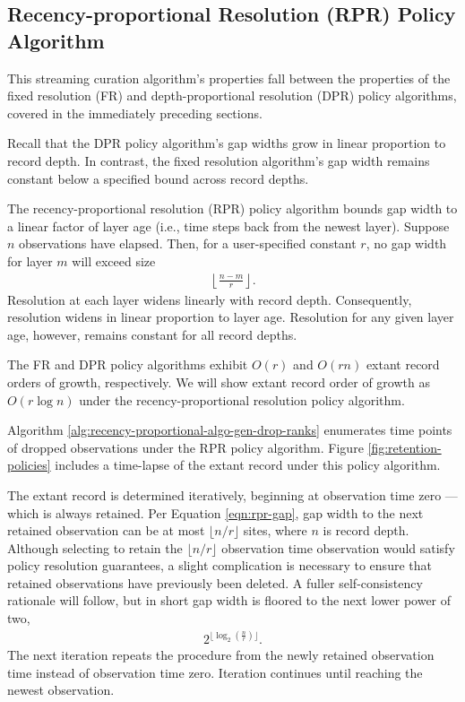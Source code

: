 \subsection{Recency-proportional Resolution (RPR) Policy Algorithm}
\label{sec:recency-proportional-resolution-algo}

This streaming curation algorithm's properties fall between the properties of the fixed resolution (FR) and depth-proportional resolution (DPR) policy algorithms, covered in the immediately preceding sections.

Recall that the DPR policy algorithm's gap widths grow in linear proportion to record depth.
In contrast, the fixed resolution algorithm's gap width remains constant below a specified bound across record depths.

The recency-proportional resolution (RPR) policy algorithm bounds gap width to a linear factor of layer age (i.e., time steps back from the newest layer).
Suppose $n$ observations have elapsed.
Then, for a user-specified constant $r$, no gap width for layer $m$ will exceed size
\begin{align}
  \left\lfloor \frac{n - m}{r} \right\rfloor.
  \label{eqn:rpr-gap}
\end{align}
Resolution at each layer widens linearly with record depth.
Consequently, resolution widens in linear proportion to layer age.
Resolution for any given layer age, however, remains constant for all record depths.

The FR and DPR policy algorithms exhibit $O(r)$ and $O(rn)$ extant record orders of growth, respectively.
We will show extant record order of growth as $O(r\log{n})$ under the recency-proportional resolution policy algorithm.

Algorithm \ref{alg:recency-proportional-algo-gen-drop-ranks} enumerates time points of dropped observations under the RPR policy algorithm.
Figure \ref{fig:retention-policies} includes a time-lapse of the extant record under this policy algorithm.

The extant record is determined iteratively, beginning at observation time zero --- which is always retained.
Per Equation \ref{eqn:rpr-gap}, gap width to the next retained observation can be at most $\lfloor n/r \rfloor$ sites, where $n$ is record depth.
Although selecting to retain the $\lfloor n/r \rfloor$ observation time observation would satisfy policy resolution guarantees, a slight complication is necessary to ensure that retained observations have previously been deleted.
A fuller self-consistency rationale will follow, but in short gap width is floored to the next lower power of two,
\begin{align*}
  2^{\lfloor \log_{2}\left(\frac{n}{r}\right) \rfloor}.
\end{align*}
The next iteration repeats the procedure from the newly retained observation time instead of observation time zero.
Iteration continues until reaching the newest observation.

